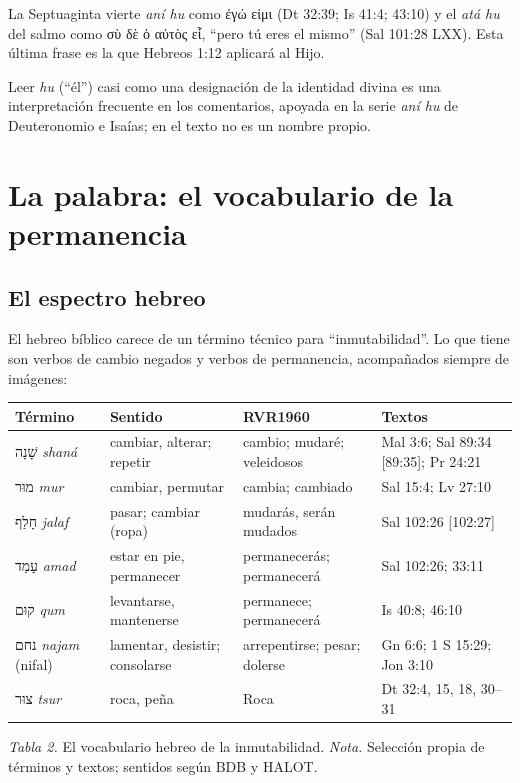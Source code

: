 \documentclass[11pt,letterpaper]{article}
\newcommand{\heb}[1]{\mbox{\foreignlanguage{hebrew}{#1}}}
\newcommand{\grc}[1]{\foreignlanguage{ancientgreek}{#1}}
\begin{document}
La Septuaginta vierte \emph{aní hu} como \grc{ἐγώ εἰμι} (Dt 32:39; Is 41:4; 43:10) y el \emph{atá hu} del salmo como \grc{σὺ δὲ ὁ αὐτὸς εἶ}, ``pero tú eres el mismo'' (Sal 101:28 LXX). Esta última frase es la que Hebreos 1:12 aplicará al Hijo.

\begin{nota}[Precisión]
Leer \emph{hu} (``él'') casi como una designación de la identidad divina es una interpretación frecuente en los comentarios, apoyada en la serie \emph{aní hu} de Deuteronomio e Isaías; en el texto no es un nombre propio.
\end{nota}

\section{La palabra: el vocabulario de la permanencia}

\subsection{El espectro hebreo}
El hebreo bíblico carece de un término técnico para ``inmutabilidad''. Lo que tiene son verbos de cambio negados y verbos de permanencia, acompañados siempre de imágenes:

\begin{center}\small\renewcommand{\arraystretch}{1.18}
\begin{tabular}{@{}L{3.0cm}L{3.6cm}L{3.0cm}L{4.0cm}@{}}
\toprule
\textbf{Término} & \textbf{Sentido} & \textbf{RVR1960} & \textbf{Textos} \\ \midrule
\heb{שָׁנָה} \emph{shaná} & cambiar, alterar; repetir & cambio; mudaré; veleidosos & Mal 3:6; Sal 89:34 [89:35]; Pr 24:21 \\
\heb{מוּר} \emph{mur} & cambiar, permutar & cambia; cambiado & Sal 15:4; Lv 27:10 \\
\heb{חָלַף} \emph{jalaf} & pasar; cambiar (ropa) & mudarás, serán mudados & Sal 102:26 [102:27] \\
\heb{עָמַד} \emph{amad} & estar en pie, permanecer & permanecerás; permanecerá & Sal 102:26; 33:11 \\
\heb{קוּם} \emph{qum} & levantarse, mantenerse & permanece; permanecerá & Is 40:8; 46:10 \\
\heb{נחם} \emph{najam} (nifal) & lamentar, desistir; consolarse & arrepentirse; pesar; dolerse & Gn 6:6; 1 S 15:29; Jon 3:10 \\
\heb{צוּר} \emph{tsur} & roca, peña & Roca & Dt 32:4, 15, 18, 30--31 \\
\bottomrule
\end{tabular}\par
{\footnotesize\color{gris}\textit{Tabla 2.} El vocabulario hebreo de la inmutabilidad. \textit{Nota.} Selección propia de términos y textos; sentidos según BDB y HALOT.}
\end{center}
\end{document}

